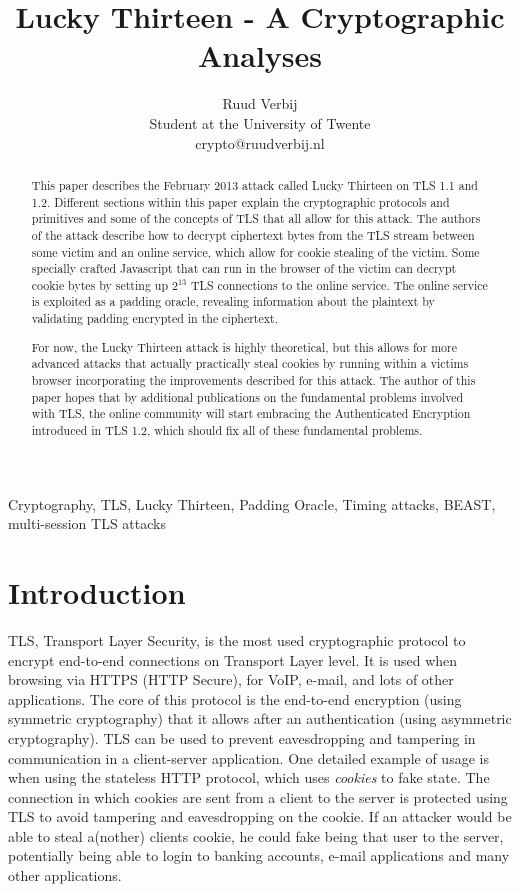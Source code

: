 \documentclass[10pt,conference,a4paper]{IEEEtran}
\title{Lucky Thirteen - A Cryptographic Analyses}
\author{Ruud Verbij \\ Student at the University of Twente \\ crypto@ruudverbij.nl}
\begin{document}
\maketitle




\begin{abstract}
This paper describes the February 2013 attack called Lucky Thirteen on TLS 1.1 and 1.2. Different sections within this paper explain the cryptographic protocols and primitives and some of the concepts of TLS that all allow for this attack. The authors of the attack describe how to decrypt ciphertext bytes from the TLS stream between some victim and an online service, which allow for cookie stealing of the victim. Some specially crafted Javascript that can run in the browser of the victim can decrypt cookie bytes by setting up $2^{13}$ TLS connections to the online service. The online service is exploited as a padding oracle, revealing information about the plaintext by validating padding encrypted in the ciphertext.

For now, the Lucky Thirteen attack is highly theoretical, but this allows for more advanced attacks that actually practically steal cookies by running within a victims browser incorporating the improvements described for this attack. The author of this paper hopes that by additional publications on the fundamental problems involved with TLS, the online community will start embracing the Authenticated Encryption introduced in TLS 1.2, which should fix all of these fundamental problems.
\end{abstract}
\begin{IEEEkeywords}
Cryptography, TLS, Lucky Thirteen, Padding Oracle, Timing attacks, BEAST, multi-session TLS attacks
\end{IEEEkeywords}




\section{Introduction}
\label{sec:intro}
TLS, Transport Layer Security, is the most used cryptographic protocol to encrypt end-to-end connections on Transport Layer level. It is used when browsing via HTTPS (HTTP Secure), for VoIP, e-mail, and lots of other applications. The core of this protocol is the end-to-end encryption (using symmetric cryptography) that it allows after an authentication (using asymmetric cryptography). TLS can be used to prevent eavesdropping and tampering in communication in a client-server application. One detailed example of usage is when using the stateless HTTP protocol, which uses \textit{cookies} to fake state. The connection in which cookies are sent from a client to the server is protected using TLS to avoid tampering and eavesdropping on the cookie. If an attacker would be able to steal a(nother) clients cookie, he could fake being that user to the server, potentially being able to login to banking accounts, e-mail applications and many other applications.
\end{document}
